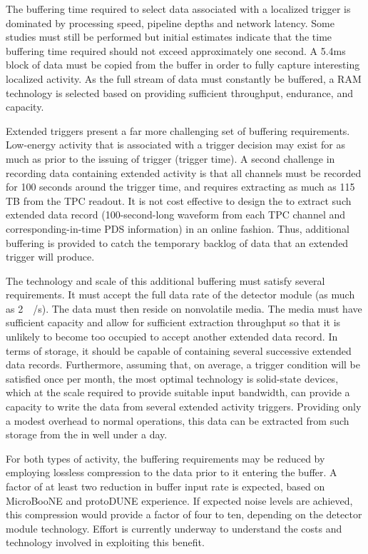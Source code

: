 The buffering time required to select data associated with a localized
trigger is dominated by processing speed, pipeline depths and network latency. Some studies must still be performed but initial estimates indicate that the time buffering time required should not exceed approximately one second. 
A  5.4\si{\milli\second} block of data must be copied from the buffer
in order to fully capture interesting localized activity. As the full stream of data must constantly be buffered, a RAM
technology is selected based on providing sufficient throughput,
endurance, and capacity. 

Extended triggers present a far more challenging set of buffering requirements.  
Low-energy activity that is associated with a  trigger
decision may exist for as much as \snbpretime prior to the issuing of 
trigger (trigger time).
A second challenge in recording data containing extended activity is
that all channels must be recorded for 100 seconds around the trigger
time, and requires extracting as much as 115 TB from the TPC readout.
It is not cost effective to design the  to extract such
extended data record (100-second-long waveform from each TPC channel
and corresponding-in-time PDS information) in an online fashion. Thus, additional buffering is provided to catch
the temporary backlog of data that an extended trigger will produce.

The technology and scale of this additional buffering must satisfy several requirements. 
It must accept the full data rate of the detector module (as much as \SI{2}{\tera\byte/\second}). 
The data must then reside on nonvolatile media. 
The media must have sufficient capacity and allow for sufficient
extraction throughput so that it is unlikely
to become too occupied to accept another extended data record. In
terms of storage, it should be capable of containing 
several successive extended data records.
Furthermore, assuming that, on average, a  trigger condition will be
satisfied once per month, the most optimal technology is %
solid-state devices, which at the scale required to provide suitable input bandwidth, can provide a capacity to write the data from several extended activity triggers.
Providing only a modest overhead to normal operations, this data can
be extracted from such storage from the  in well under a day.

For both types of activity, the buffering requirements may be reduced by employing lossless compression to the data prior to it entering the buffer.
A factor of at least two reduction in buffer input rate is
expected, based on MicroBooNE and protoDUNE experience. 
If expected noise levels are achieved, this compression would provide a factor of four to ten, depending on the detector module technology.
Effort is currently underway to understand the costs and technology involved in exploiting this benefit.

